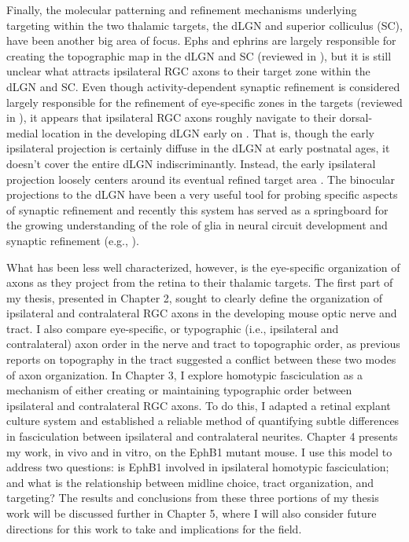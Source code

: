 Finally, the molecular patterning and refinement mechanisms underlying targeting within the two thalamic targets, the dLGN and superior colliculus (SC), have been another big area of focus.
Ephs and ephrins are largely responsible for creating the topographic map in the dLGN and SC (reviewed in \cite{erskine2014connecting,feldheim2010visual}), but it is still unclear what attracts ipsilateral RGC axons to their target zone within the dLGN and SC.
Even though activity-dependent synaptic refinement is considered largely responsible for the refinement of eye-specific zones in the targets (reviewed in \cite{feller2009retinal}), it appears that ipsilateral RGC axons roughly navigate to their dorsal-medial location in the developing dLGN early on \cite{jaubert2005structural}.
That is, though the early ipsilateral projection is certainly diffuse in the dLGN at early postnatal ages, it doesn't cover the entire dLGN indiscriminantly.
Instead, the early ipsilateral projection loosely centers around its eventual refined target area \cite{jaubert2005structural}.
The binocular projections to the dLGN have been a very useful tool for probing specific aspects of synaptic refinement and recently this system has served as a springboard for the growing understanding of the role of glia in neural circuit development and synaptic refinement (e.g., \cite{chung2013astrocytes,schafer2012microglia}).

What has been less well characterized, however, is the eye-specific organization of axons as they project from the retina to their thalamic targets.
The first part of my thesis, presented in Chapter 2, sought to clearly define the organization of ipsilateral and contralateral RGC axons in the developing mouse optic nerve and tract.
I also compare eye-specific, or typographic (i.e., ipsilateral and contralateral) axon order in the nerve and tract to topographic order, as previous reports on topography in the tract suggested a conflict between these two modes of axon organization.
In Chapter 3, I explore homotypic fasciculation as a mechanism of either creating or maintaining typographic order between ipsilateral and contralateral RGC axons.
To do this, I adapted a retinal explant culture system and established a reliable method of quantifying subtle differences in fasciculation between ipsilateral and contralateral neurites.
Chapter 4 presents my work, in vivo and in vitro, on the EphB1 mutant mouse.
I use this model to address two questions: is EphB1 involved in ipsilateral homotypic fasciculation; and what is the relationship between midline choice, tract organization, and targeting?
The results and conclusions from these three portions of my thesis work will be discussed further in Chapter 5, where I will also consider future directions for this work to take and implications for the field.

